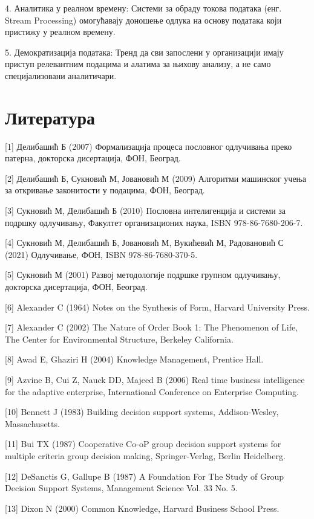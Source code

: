 4. Аналитика у реалном времену: Системи за обраду токова података (енг. Stream Processing) омогућавају доношење одлука на основу података који пристижу у реалном времену.

5. Демократизација података: Тренд да сви запослени у организацији имају приступ релевантним подацима и алатима за њихову анализу, а не само специјализовани аналитичари.

\section{Литература}
[1] Делибашић Б (2007) Формализација процеса пословног одлучивања преко патерна, докторска дисертација, ФОН, Београд.

[2] Делибашић Б, Сукновић М, Јовановић М (2009) Алгоритми машинског учења за откривање законитости у подацима, ФОН, Београд.

[3] Сукновић М, Делибашић Б (2010) Пословна интелигенција и системи за подршку одлучивању, Факултет организационих наука, ISBN 978-86-7680-206-7.

[4] Сукновић М, Делибашић Б, Јовановић М, Вукићевић М, Радовановић С (2021) Одлучивање, ФОН, ISBN 978-86-7680-370-5.

[5] Сукновић М (2001) Развој методологије подршке групном одлучивању, докторска дисертација, ФОН, Београд.

[6] Alexander C (1964) Notes on the Synthesis of Form, Harvard University Press.

[7] Alexander C (2002) The Nature of Order Book 1: The Phenomenon of Life, The Center for Environmental Structure, Berkeley California.

[8] Awad E, Ghaziri H (2004) Knowledge Management, Prentice Hall.

[9] Azvine B, Cui Z, Nauck DD, Majeed B (2006) Real time business intelligence for the adaptive enterprise, International Conference on Enterprise Computing.

[10] Bennett J (1983) Building decision support systems, Addison-Wesley, Massachusetts.

[11] Bui TX (1987) Cooperative Co-oP group decision support systems for multiple criteria group decision making, Springer-Verlag, Berlin Heidelberg.

[12] DeSanctis G, Gallupe B (1987) A Foundation For The Study of Group Decision Support Systems, Management Science Vol. 33 No. 5.

[13] Dixon N (2000) Common Knowledge, Harvard Business School Press.

